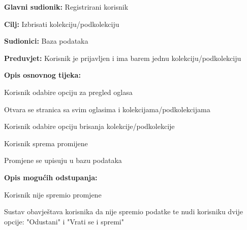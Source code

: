 				\noindent {}
					\begin{packed_item}
	
						\item \textbf{Glavni sudionik: }Registrirani korisnik
						\item  \textbf{Cilj:} Izbrisati kolekciju/podkolekciju
						\item  \textbf{Sudionici:} Baza podataka
						\item  \textbf{Preduvjet:} Korisnik je prijavljen i ima barem jednu kolekciju/podkolekciju
						\item  \textbf{Opis osnovnog tijeka:}
						
						\item[] \begin{packed_enum}
	
							\item Korisnik odabire opciju za pregled oglasa
							\item Otvara se stranica sa svim oglasima i kolekcijama/podkolekcijama
							\item Korisnik odabire opciju brisanja kolekcije/podkolekcije
							\item Korisnik sprema promijene
							\item Promjene se upisuju u bazu podataka

						\end{packed_enum}	
						
						\item  \textbf{Opis mogućih odstupanja:}
						
						\item[] \begin{packed_item}
	
							\item[4.a] Korisnik nije spremio promjene
								\begin{packed_item}
									\item Sustav obavještava korisnika da nije spremio podatke te nudi korisniku dvije opcije: "Odustani" i "Vrati se i spremi"
								\end{packed_item}
								
						\end{packed_item}					
					\end{packed_item}
					
